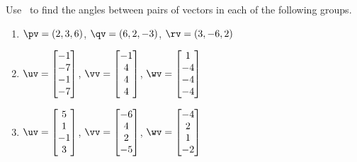 \begin{exercise} \label{ex:} 
Use \script\ to find the angles between pairs of vectors in each of the following groups.
\begin{enumerate}\sloppy
\item \(\pv=(2,3,6)\), \(\qv=(6,2,-3)\), \(\rv=(3,-6,2)\)

\item \(\uv=\begin{bmatrix}-1\\-7\\-1\\-7\end{bmatrix}\), \(\vv=\begin{bmatrix}-1\\4\\4\\4\end{bmatrix}\), \(\wv=\begin{bmatrix}1\\-4\\-4\\-4\end{bmatrix}\)
\setbox\ajrqrbox\hbox{}%
\marginpar{\usebox{\ajrqrbox\\[2ex]}}%

\item \(\uv=\begin{bmatrix}5\\1\\-1\\3\end{bmatrix}\), \(\vv=\begin{bmatrix}-6\\4\\2\\-5\end{bmatrix}\), \(\wv=\begin{bmatrix}-4\\2\\1\\-2\end{bmatrix}\)
\setbox\ajrqrbox\hbox{}%
\marginpar{\usebox{\ajrqrbox\\[2ex]}}%


\end{enumerate}
\end{exercise}
